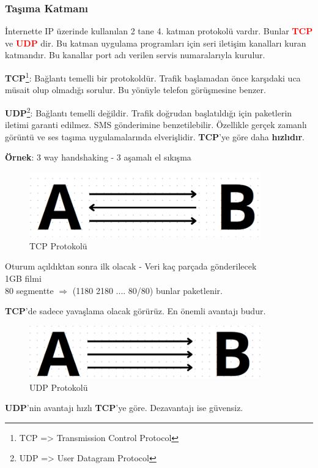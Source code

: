 \subsubsection{Taşıma Katmanı}\label{subsubsec:tasima_katmani}
\tab İnternette IP üzerinde kullanılan 2 tane 4. katman protokolü vardır.
Bunlar \textcolor{red}{\textbf{TCP}} ve \textcolor{red}{\textbf{UDP}} dir.
Bu katman uygulama programları için seri iletişim kanalları kuran katmandır.
Bu kanallar port adı verilen servis numaralarıyla kurulur.

\textbf{TCP}\footnote{TCP => Transmission Control Protocol}: Bağlantı temelli bir protokoldür. Trafik başlamadan önce karşıdaki uca müsait olup olmadığı sorulur.
Bu yönüyle telefon görüşmesine benzer.

\textbf{UDP}\footnote{UDP => User Datagram Protocol}: Bağlantı temelli değildir. Trafik doğrudan başlatıldığı için paketlerin iletimi garanti edilmez.
SMS gönderimine benzetilebilir. Özellikle gerçek zamanlı görüntü ve ses taşıma uygulamalarında elverişlidir.
\textbf{TCP}'ye göre daha \textbf{hızlıdır}.

\textbf{Örnek}: 3 way handshaking - 3 aşamalı el sıkışma
\begin{figure}[ht]
	\centering
	\includegraphics[width=10cm]{images/tcp_example}
	\caption{TCP Protokolü}
	\label{fig:tcp_example}
\end{figure}
Oturum açıldıktan sonra ilk olacak
- Veri kaç parçada gönderilecek \\
1GB filmi \\
80 segmentte $\Rightarrow$ (1180 2180 .... 80/80) bunlar paketlenir.

\textbf{TCP}'de sadece yavaşlama olacak görürüz.
En önemli avantajı budur.

\begin{figure}[ht]
	\centering
	\includegraphics[width=10cm]{images/upd_example}
	\caption{UDP Protokolü}
	\label{fig:upd_example}
\end{figure}
\textbf{UDP}'nin avantajı hızlı  \textbf{TCP}'ye göre. Dezavantajı ise güvensiz.

